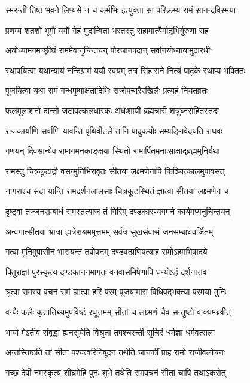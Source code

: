 \twolineshloka
{स्मरन्ती तिष्ठ भवने लिप्यसे न च कर्मभिः}
{इत्युक्ता सा परिक्रम्य रामं सानन्दविस्मया} %

\twolineshloka
{प्रणम्य शतशो भूमौ ययौ गेहं मुदान्विता}
{भरतस्तु सहामात्यैर्मातृभिर्गुरुणा सह} %

\twolineshloka
{अयोध्यामगमच्छ्रीघ्रं राममेवानुचिन्तयन्}
{पौरजानपदान् सर्वानयोध्यायामुदारधीः} %

\twolineshloka
{स्थापयित्वा यथान्यायं नन्दिग्रामं ययौ स्वयम्}
{तत्र सिंहासने नित्यं पादुके स्थाप्य भक्तितः} %

\twolineshloka
{पूजयित्वा यथा रामं गन्धपुष्पाक्षतादिभिः}
{राजोपचारैरखिलैः प्रत्यहं नियतव्रतः} %

\twolineshloka
{फलमूलाशनो दान्तो जटावल्कलधारकः}
{अधःशायी ब्रह्मचारी शत्रुघ्नसहितस्तदा} %

\twolineshloka
{राजकार्याणि सर्वाणि यावन्ति पृथिवीतले}
{तानि पादुकयोः सम्यङ्निवेदयति राघवः} %

\twolineshloka
{गणयन् दिवसान्येव रामागमनकाङ्क्षया}
{स्थितो रामार्पितमनाःसाक्षाद्ब्रह्ममुनिर्यथा} %

\twolineshloka
{रामस्तु चित्रकूटाद्रौ वसन्मुनिभिरावृतः}
{सीतया लक्ष्मणेनापि किञ्चित्कालमुपावसत्} %

\twolineshloka
{नागराश्च सदा यान्ति रामदर्शनलालसाः}
{चित्रकूटस्थितं ज्ञात्वा सीतया लक्ष्मणेन च} %

\twolineshloka
{दृष्ट्वा तज्जनसम्बाधं रामस्तत्याज तं गिरिम्}
{दण्डकारण्यगमने कार्यमप्यनुचिन्तयन्} %

\twolineshloka
{अन्वगात्सीतया भ्रात्रा ह्यत्रेराश्रममुत्तमम्}
{सर्वत्र सुखसंवासं जनसम्बाधवर्जितम्} %

\twolineshloka
{गत्वा मुनिमुपासीनं भासयन्तं तपोवनम्}
{दण्डवत्प्रणिपत्याह रामोऽहमभिवादये} %

\twolineshloka
{पितुराज्ञां पुरस्कृत्य दण्डकाननमागतः}
{वनवासमिषेणापि धन्योऽहं दर्शनात्तव} %

\twolineshloka
{श्रुत्वा रामस्य वचनं रामं ज्ञात्वा हरिं परम्}
{पूजयामास विधिवद्भक्त्या परमया मुनिः} %

\twolineshloka
{वन्यैः फलैः कृतातिथ्यमुपविष्टं रघूत्तमम्}
{सीतां च लक्ष्मणं चैव सन्तुष्टो वाक्यमब्रवीत्} %

\twolineshloka
{भार्या मेऽतीव संवृद्धा ह्यनसूयेति विश्रुता}
{तपश्चरन्ती सुचिरं धर्मज्ञा धर्मवत्सला} %

\twolineshloka
{अन्तस्तिष्ठति तां सीता पश्यत्वरिनिषूदन}
{तथेति जानकीं प्राह रामो राजीवलोचनः} %

\twolineshloka
{गच्छ देवीं नमस्कृत्य शीघ्रमेहि पुनः शुभे}
{तथेति रामवचनं सीता चापि तथाऽकरोत्} %

